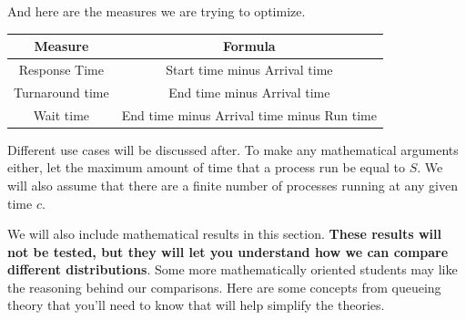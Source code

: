 And here are the measures we are trying to optimize.

\begin{tabular}{|c|c|}
  Measure & Formula \\ \hline
  Response Time & Start time minus Arrival time\\
  Turnaround time & End time minus Arrival time\\
  Wait time & End time minus Arrival time minus Run time \\
\end{tabular}

Different use cases will be discussed after.
To make any mathematical arguments either, let the maximum amount of time that a process run be equal to $S$.
We will also assume that there are a finite number of processes running at any given time $c$.

We will also include mathematical results in this section.
\textbf{These results will not be tested, but they will let you understand how we can compare different distributions}.
Some more mathematically oriented students may like the reasoning behind our comparisons.
Here are some concepts from queueing theory that you'll need to know that will help simplify the theories.

